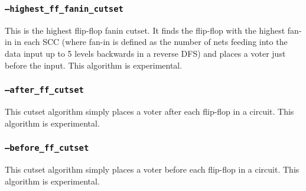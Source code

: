 \subsubsection{\texttt{--highest\_ff\_fanin\_cutset}}
This is the highest flip-flop fanin cutset. It finds the flip-flop with the
highest fan-in in each SCC (where fan-in is defined as the number of nets
feeding into the data input up to 5 levels backwards in a reverse DFS) and
places a voter just before the input. This algorithm is experimental.

\subsubsection{\texttt{--after\_ff\_cutset}}
This cutset algorithm simply places a voter after each flip-flop in a circuit.
This algorithm is experimental.

\subsubsection{\texttt{--before\_ff\_cutset}}
This cutset algorithm simply places a voter before each flip-flop in a circuit.
This algorithm is experimental.





